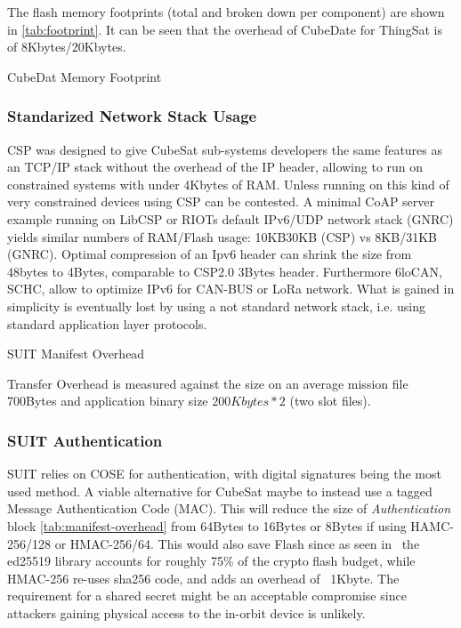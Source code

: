 The flash memory footprints (total and broken down per component) are shown in
\ref*{tab:footprint}. It can be seen that the overhead of CubeDate for ThingSat
is of 8Kbytes/20Kbytes. 

\begin{table}[ht]
    \caption{CubeDat Memory Footprint}
    \label{tab:footprint}
    \centering
    
\end{table}

\subsubsection{Standarized Network Stack Usage}

CSP was designed to give CubeSat sub-systems developers the same features as an
TCP/IP stack without the overhead of the IP header, allowing to run on constrained
systems with under 4Kbytes of RAM. Unless running on this kind of very constrained
devices using CSP can be contested. A minimal CoAP server example running on
LibCSP or RIOTs default IPv6/UDP network stack (GNRC) yields similar numbers of RAM/Flash
usage: 10KB\/30KB (CSP) vs 8KB/31KB (GNRC). Optimal compression of an Ipv6 header
can shrink the size from 48bytes to 4Bytes, comparable to CSP2.0 3Bytes header.
Furthermore  6loCAN\cite{wachter20206locan01}, SCHC\cite{rfc8724}, allow to
optimize IPv6 for CAN-BUS or LoRa network. What is gained in simplicity is eventually
lost by using a not standard network stack, i.e. using standard application
layer protocols.

\begin{table}[ht]
    \caption{SUIT Manifest Overhead}
    \label{tab:manifest-overhead}
    \centering
    
      \small Transfer Overhead is measured against the size on an average mission file
      700Bytes and application binary size \(200 Kbytes * 2\) (two slot files).
\end{table}

\subsubsection{SUIT Authentication}

SUIT relies on COSE for authentication, with digital signatures being the most
used method. A viable alternative for CubeSat maybe to instead use a tagged Message
Authentication Code (MAC). This will reduce the size of \textit{Authentication} block
\ref*{tab:manifest-overhead} from 64Bytes to 16Bytes or 8Bytes if using HAMC-256/128
or HMAC-256/64. This would also save Flash since as seen in~\cite{zandberg2019secure}
the ed25519 library accounts for roughly 75\% of the crypto flash budget, while HMAC-256
re-uses sha256 code, and adds an overhead of ~1Kbyte. The requirement for a shared secret
might be an acceptable compromise since attackers gaining physical access to the
in-orbit device is unlikely.

